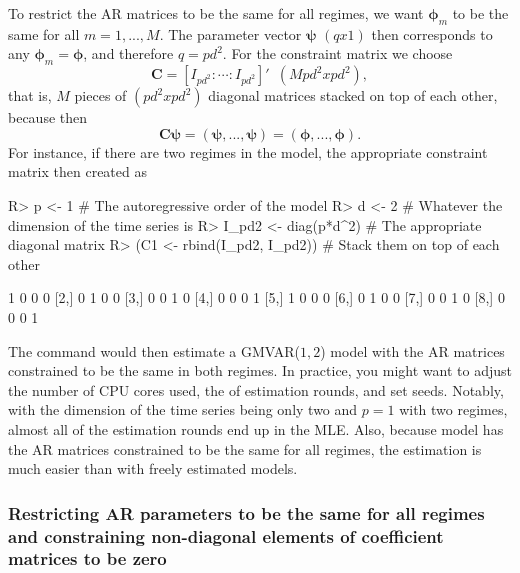 \documentclass[nojss]{jss}
\begin{document}
To restrict the AR matrices to be the same for all regimes, we want $\boldsymbol{\phi}_m$ to be the same for all $m=1,...,M$. The parameter vector $\boldsymbol{\psi}$ $(qx1)$ then corresponds to any $\boldsymbol{\phi}_m=\boldsymbol{\phi}$, and therefore $q=pd^2$. For the constraint matrix we choose
\begin{equation}
\boldsymbol{C} = [I_{pd^2}:\cdots:I_{pd^2}]' \enspace (Mpd^2xpd^2),
\end{equation}
that is, $M$ pieces of $(pd^2xpd^2)$ diagonal matrices stacked on top of each other, because then
\begin{equation}
\boldsymbol{C}\boldsymbol{\psi}=(\boldsymbol{\psi},...,\boldsymbol{\psi})=(\boldsymbol{\phi},...,\boldsymbol{\phi}).
\end{equation}
For instance, if there are two regimes in the model, the appropriate constraint matrix then created as
%
\begin{CodeChunk}
\begin{CodeInput}
R> p <- 1 # The autoregressive order of the model
R> d <- 2 # Whatever the dimension of the time series is
R> I_pd2 <- diag(p*d^2) # The appropriate diagonal matrix
R> (C1 <- rbind(I_pd2, I_pd2)) # Stack them on top of each other
\end{CodeInput}
\begin{CodeOutput}
     [,1] [,2] [,3] [,4]
[1,]    1    0    0    0
[2,]    0    1    0    0
[3,]    0    0    1    0
[4,]    0    0    0    1
[5,]    1    0    0    0
[6,]    0    1    0    0
[7,]    0    0    1    0
[8,]    0    0    0    1
\end{CodeOutput}
\end{CodeChunk}
%
The command  would then estimate a GMVAR($1,2$) model with the AR matrices constrained to be the same in both regimes. In practice, you might want to adjust the number of CPU cores used, the of estimation rounds, and set seeds. Notably, with the dimension of the time series being only two and $p=1$ with two regimes, almost all of the estimation rounds end up in the MLE. Also, because model has the AR matrices constrained to be the same for all regimes, the estimation is much easier than with freely estimated models.

\subsubsection{Restricting AR parameters to be the same for all regimes and constraining non-diagonal elements of coefficient matrices to be zero}
\end{document}
